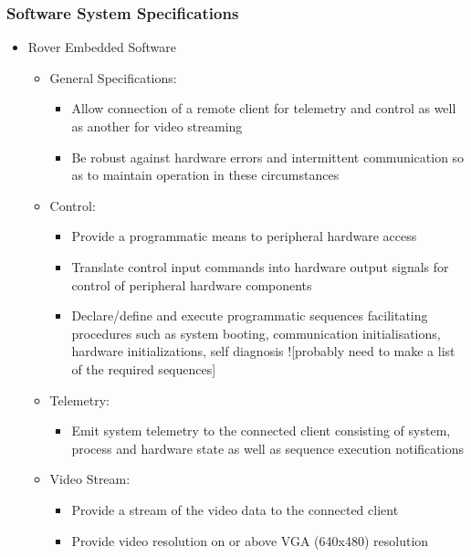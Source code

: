     \subsubsection{Software System Specifications}
      \begin{itemize}
        \item Rover Embedded Software
        \begin{itemize}
          \item General Specifications:
          \begin{itemize}
            \item Allow connection of a remote client for telemetry and control as well as another for video streaming
            \item Be robust against hardware errors and intermittent communication so as to maintain operation in these circumstances
          \end{itemize}
          \item Control:
          \begin{itemize}
            \item Provide a programmatic means to peripheral hardware access
            \item Translate control input commands into hardware output signals for control of peripheral hardware components
            \item Declare/define and execute programmatic sequences facilitating procedures such as system booting, communication initialisations, hardware initializations, self diagnosis ![probably need to make a list of the required sequences]
          \end{itemize}
          \item Telemetry:
          \begin{itemize}
            \item Emit system telemetry to the connected client consisting of system, process and hardware state as well as sequence execution notifications
          \end{itemize}
          \item Video Stream:
          \begin{itemize}
            \item Provide a stream of the video data to the connected client
            \item Provide video resolution on or above VGA (640x480) resolution
          \end{itemize}
        \end{itemize}
        

\end{itemize}
